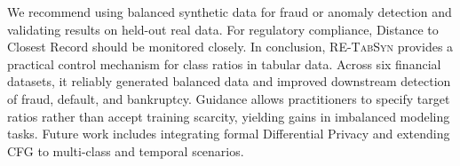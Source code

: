 \documentclass[conference]{IEEEtran}
\newcommand{\retabsyn}{\textsc{RE-TabSyn}}
\begin{document}
We recommend using balanced synthetic data for fraud or anomaly detection and validating results on held-out real data. For regulatory compliance, Distance to Closest Record should be monitored closely. In conclusion, \retabsyn{} provides a practical control mechanism for class ratios in tabular data. Across six financial datasets, it reliably generated balanced data and improved downstream detection of fraud, default, and bankruptcy. Guidance allows practitioners to specify target ratios rather than accept training scarcity, yielding gains in imbalanced modeling tasks. Future work includes integrating formal Differential Privacy and extending CFG to multi-class and temporal scenarios.


\footnotesize

\setlength{\itemsep}{0pt}
\setlength{\bibsep}{2pt}

\end{document}
